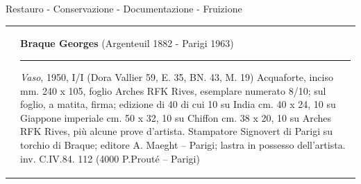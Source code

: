 \documentclass[hidelinks,aspectratio=169]{beamer}
\begin{document}
\begin{frame}{Restauro - Conservazione - Documentazione - Fruizione}
\begin{tabularx}{\linewidth}{XX}
{			}&{
			\vspace*{-65mm}
			\textbf{Braque Georges}
			\newline
			(Argenteuil 1882 - Parigi 1963)
			\newline
			\hrule
			\bigskip
			\small{\textit{Vaso}, 1950, I/I \newline
			(Dora Vallier 59, E. 35, BN. 43, M. 19)\newline
			Acquaforte, inciso mm. 240 x 105, foglio Arches RFK Rives, esemplare numerato 8/10; sul foglio, a matita, firma; edizione di 40 di cui 10 su India cm. 40 x 24, 10 su Giappone imperiale cm. 50 x 32, 10 su Chiffon cm. 38 x 20, 10 su Arches RFK Rives, più alcune prove d’artista. Stampatore Signovert di Parigi su torchio di Braque; editore A. Maeght – Parigi; lastra in possesso dell’artista. \newline
			inv. C.IV.84. 112 (4000 P.Prouté – Parigi)}
			}
		\end{tabularx}
	\end{frame}
	
\end{document}
